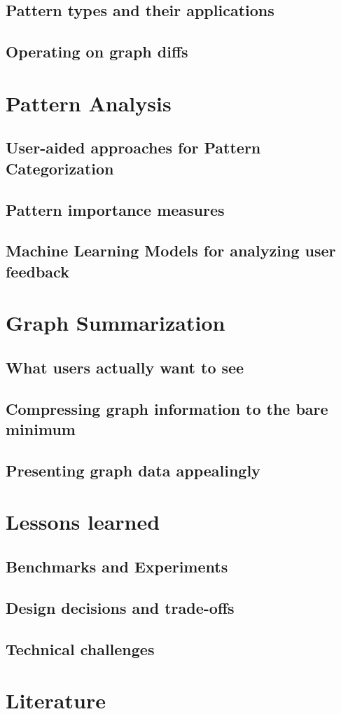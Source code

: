 \documentclass[
        a4paper,     %
        titlepage,   %
        twoside,     %
        parskip      %
        ]{scrartcl}  %
\begin{document}
    \subsection{Pattern types and their applications}
    \subsection{Operating on graph diffs}
  \section{Pattern Analysis}
    \subsection{User-aided approaches for Pattern Categorization}
    \subsection{Pattern importance measures}
    \subsection{Machine Learning Models for analyzing user feedback}
  \section{Graph Summarization}
    \subsection{What users actually want to see}
    \subsection{Compressing graph information to the bare minimum}
    \subsection{Presenting graph data appealingly}
  \section{Lessons learned}
    \subsection{Benchmarks and Experiments}
    \subsection{Design decisions and trade-offs}
    \subsection{Technical challenges}

  \section{Literature}

  \clearpage
  
\end{document}
